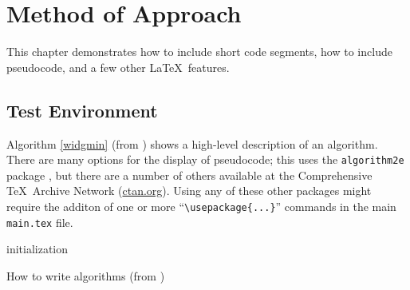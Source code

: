 %
%
%
\chapter{Method of Approach} \label{ch:method}
This chapter demonstrates how to include short code segments,
how to include pseudocode, and a few other \LaTeX\ features.

\section{Test Environment}
Algorithm \ref{widgmin} (from \cite{Fiori:2013}) shows a high-level description of an
algorithm. There are many options for the display of
pseudocode; this uses the {\tt algorithm2e} package \cite{Fiori:2013},
but there are a number of others available at the Comprehensive \TeX\ Archive
Network (\url{ctan.org}). Using any of these
other packages might require the additon of one or more
``\verb$\usepackage{...}$'' commands in the main {\tt main.tex} file.


\begin{algorithm}[htbp]
 \SetAlgoLined %
 initialization\;
 \caption{How to write algorithms (from \cite{Fiori:2013})}
\label{widgmin}
\end{algorithm}

